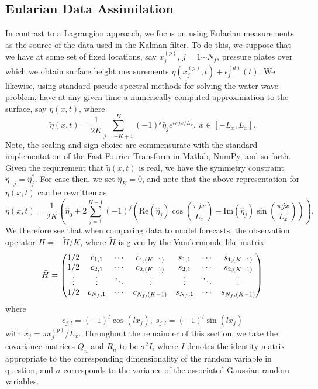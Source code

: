 \subsection*{Eularian Data Assimilation}
In contrast to a Lagrangian approach, we focus on using Eularian measurements as the source of the data used in the Kalman filter.  To do this, we suppose that we have at some set of fixed locations, say $x^{(p)}_{j}$, $j=1\cdots N_{f}$, pressure plates over which we obtain surface height measurements $\eta(x^{(p)}_{j},t)+\epsilon^{(d)}_{j}(t)$.  We likewise, using standard pseudo-spectral methods for solving the water-wave problem, have at any given time a numerically computed approximation to the surface, say $\tilde{\eta}(x,t)$, where 
\[
\tilde{\eta}(x,t) = \frac{1}{2K}\sum_{j=-K+1}^{K}(-1)^{j}\hat{\eta}_{j}e^{i\pi jx/L_{x}}, ~ x \in [-L_{x},L_{x}].
\]
Note, the scaling and sign choice are commensurate with the standard implementation of the Fast Fourier Transform in Matlab, NumPy, and so forth.  Given the requirement that $\tilde{\eta}(x,t)$ is real, we have the symmetry constraint $\hat{\eta}_{-j} = \hat{\eta}^{\ast}_{j}$.  For ease then, we set $\hat{\eta}_{K}=0$, and note that the above representation for $\tilde{\eta}(x,t)$ can be rewritten as 
\[
\tilde{\eta}(x,t) = \frac{1}{2K}\left(\hat{\eta}_{0} + 2\sum_{j=1}^{K-1} (-1)^{j}\left( \mbox{Re}(\hat{\eta}_{j})\cos\left(\frac{\pi j x}{L_{x}}\right) -  \mbox{Im}(\hat{\eta}_{j})\sin\left(\frac{\pi j x}{L_{x}}\right)\right) \right), 
\]
We therefore see that when comparing data to model forecasts, the observation operator $H=-\tilde{H}/K$, where $\tilde{H}$ is given by the Vandermonde like matrix
\[
\tilde{H} =
\begin{pmatrix} 
1/2 & c_{1,1}  & \cdots & c_{1,(K-1)} & s_{1,1} & \cdots &  s_{1,(K-1)} \\  
1/2 & c_{2,1}  & \cdots & c_{2,(K-1)} & s_{2,1} & \cdots &  s_{2,(K-1)} \\
\vdots & \vdots & \ddots & \vdots & \vdots & \ddots & \vdots \\ 
1/2 & c_{N_{f},1}  & \cdots & c_{N_{f},(K-1)} & s_{N_{f},1} & \cdots &  s_{N_{f},(K-1)}
\end{pmatrix} 
\]
where
\[
c_{j,l} = (-1)^{l}\cos(l\tilde{x}_{j}), ~ s_{j,l} = (-1)^{l}\sin(l\tilde{x}_{j})
\]
with $\tilde{x}_{j} = \pi x^{(p)}_{j}/L_{x}$.  Throughout the remainder of this section, we take the covariance matrices $Q_{n}$ and $R_{n}$ to be $\sigma^{2}I$, where $I$ denotes the identity matrix appropriate to the corresponding dimensionality of the random variable in question, and $\sigma$ corresponds to the variance of the associated Gaussian random variables.    